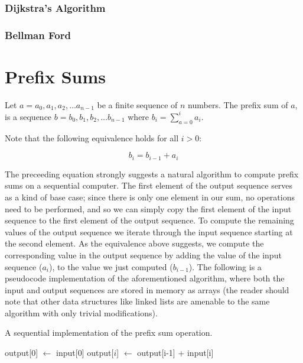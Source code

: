 \documentclass[12pt,twoside]{reedthesis}
\begin{document}
\subsection{Dijkstra's Algorithm}
\subsection{Bellman Ford}


\chapter{Prefix Sums}
Let $a = a_0, a_1, a_2, \ldots a_{n-1}$ be a finite sequence of $n$
numbers.  The prefix sum of $a$, is a sequence $b = b_0, b_1, b_2,
\ldots b_{n-1}$ where $b_i = \sum_{a = 0}^i a_i$.



\vspace{1pc}

Note that the following equivalence holds for all $i > 0$:

$$
b_i = b_{i-1} + a_i
$$

The preceeding equation strongly suggests a natural algorithm to
compute prefix sums on a sequential computer. The first element of
the output sequence serves as a kind of base case; since there is
only one element in our sum, no operations need to be performed, and so we can simply copy the first element of the input sequence to the first element of the output sequence.  To compute the remaining values of the output sequence we iterate through the input sequence starting at the second element.  As the equivalence above suggests, we compute the corresponding value in the output sequence by adding the value of the input sequence ($a_i$), to the value we just computed ($b_{i-1}$). The following is a pseudocode implementation of the aforementioned algorithm, where both the input and output sequences are stored in memory as arrays (the reader should note that other data structures like linked lists are amenable to the same algorithm with only trivial modifications).

\begin{algorithm}
\caption{A sequential implementation of the prefix sum operation.}
\begin{algorithmic}
\STATE output[0] $\leftarrow$ input[0]
\STATE output[$i$] $\leftarrow$ output[i-1] + input[i] 
\ENDFOR
\end{algorithmic}
\end{algorithm}
\end{document}
